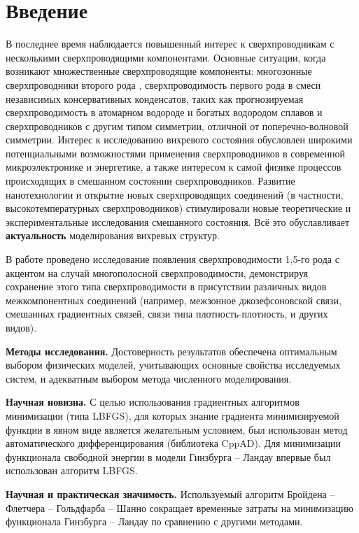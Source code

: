 \chapter*{Введение}

В последнее время наблюдается повышенный интерес к сверхпроводникам с 
несколькими сверхпроводящими компонентами. Основные ситуации, когда возникают 
множественные сверхпроводящие компоненты: многозонные сверхпроводники второго 
рода \cite{bib:6,bib:7,bib:8,bib:9,bib:10,bib:11}, сверхпроводимость первого 
рода в смеси независимых консервативных конденсатов, таких как прогнозируемая 
сверхпроводимость в атомарном водороде и богатых водородом сплавов 
\cite{bib:12.1,bib:12.2,bib:13,bib:14} и сверхпроводников с другим типом 
симметрии, отличной от поперечно-волновой симметрии. Интерес к исследованию 
вихревого состояния обусловлен широкими потенциальными возможностями 
применения сверхпроводников в современной микроэлектронике и энергетике, а 
также интересом к самой физике процессов происходящих в смешанном состоянии 
сверхпроводников. Развитие нанотехнологии и открытие новых сверхпроводящих 
соединений (в частности, высокотемпературных сверхпроводников) стимулировали 
новые теоретические и экспериментальные исследования смешанного состояния. 
Всё это обуславливает \textbf{актуальность} моделирования вихревых структур.

В работе проведено исследование появления сверхпроводимости 1,5-го рода с 
акцентом на случай многополосной сверхпроводимости, демонстрируя сохранение 
этого типа сверхпроводимости в присутствии различных видов межкомпонентных 
соединений (например, межзонное джозефсоновской связи, смешанных градиентных 
связей, связи типа плотность-плотность, и других видов).

\textbf{Методы исследования.} Достоверность результатов обеспечена 
оптимальным выбором физических моделей, учитывающих основные свойства 
исследуемых систем, и адекватным выбором метода численного моделирования.

\textbf{Научная новизна.} С целью использования градиентных алгоритмов 
минимизации (типа LBFGS), для которых знание градиента минимизируемой функции 
в явном виде является желательным условием, был использован метод 
автоматического дифференцирования (библиотека CppAD). Для минимизации 
функционала свободной энергии в модели Гинзбурга -- Ландау впервые был 
использован алгоритм LBFGS.

\textbf{Научная и практическая значимость.} Используемый алгоритм 
Бройдена -- Флетчера -- Гольдфарба -- Шанно сокращает временные затраты на 
минимизацию функционала Гинзбурга -- Ландау по сравнению с другими методами.

\newpage